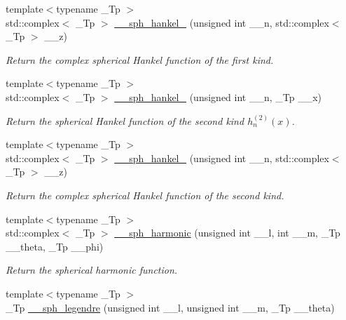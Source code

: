 \begin{DoxyCompactItemize}
{\footnotesize template$<$typename \+\_\+\+Tp $>$ }\\std\+::complex$<$ \+\_\+\+Tp $>$ \hyperlink{namespacestd_1_1____detail_a887838c407a7cdb7c4ee145a18d2aa12}{\+\_\+\+\_\+sph\+\_\+hankel\+\_} (unsigned int \+\_\+\+\_\+n, std\+::complex$<$ \+\_\+\+Tp $>$ \+\_\+\+\_\+z)
\begin{DoxyCompactList}\small\item\em Return the complex spherical Hankel function of the first kind. \end{DoxyCompactList}\item 
{\footnotesize template$<$typename \+\_\+\+Tp $>$ }\\std\+::complex$<$ \+\_\+\+Tp $>$ \hyperlink{namespacestd_1_1____detail_a89fe914f377a138d37369d13bda1162e}{\+\_\+\+\_\+sph\+\_\+hankel\+\_} (unsigned int \+\_\+\+\_\+n, \+\_\+\+Tp \+\_\+\+\_\+x)
\begin{DoxyCompactList}\small\item\em Return the spherical Hankel function of the second kind $ h^{(2)}_n(x) $. \end{DoxyCompactList}\item 
{\footnotesize template$<$typename \+\_\+\+Tp $>$ }\\std\+::complex$<$ \+\_\+\+Tp $>$ \hyperlink{namespacestd_1_1____detail_ade83ff0131b8880428cbd58028d89bc5}{\+\_\+\+\_\+sph\+\_\+hankel\+\_} (unsigned int \+\_\+\+\_\+n, std\+::complex$<$ \+\_\+\+Tp $>$ \+\_\+\+\_\+z)
\begin{DoxyCompactList}\small\item\em Return the complex spherical Hankel function of the second kind. \end{DoxyCompactList}\item 
{\footnotesize template$<$typename \+\_\+\+Tp $>$ }\\std\+::complex$<$ \+\_\+\+Tp $>$ \hyperlink{namespacestd_1_1____detail_a31b9beb882431d61d439862de0366eec}{\+\_\+\+\_\+sph\+\_\+harmonic} (unsigned int \+\_\+\+\_\+l, int \+\_\+\+\_\+m, \+\_\+\+Tp \+\_\+\+\_\+theta, \+\_\+\+Tp \+\_\+\+\_\+phi)
\begin{DoxyCompactList}\small\item\em Return the spherical harmonic function. \end{DoxyCompactList}\item 
{\footnotesize template$<$typename \+\_\+\+Tp $>$ }\\\+\_\+\+Tp \hyperlink{namespacestd_1_1____detail_a1c819d02915bdc2ab5c7693513ce0be0}{\+\_\+\+\_\+sph\+\_\+legendre} (unsigned int \+\_\+\+\_\+l, unsigned int \+\_\+\+\_\+m, \+\_\+\+Tp \+\_\+\+\_\+theta)

\end{DoxyCompactItemize}
